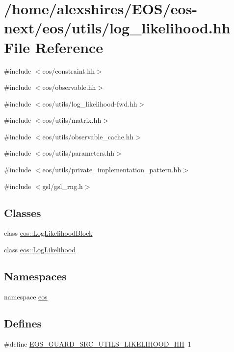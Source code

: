 \hypertarget{log__likelihood_8hh}{
\section{/home/alexshires/EOS/eos-\/next/eos/utils/log\_\-likelihood.hh File Reference}
\label{log__likelihood_8hh}
}
{\ttfamily \#include $<$eos/constraint.hh$>$}\par
{\ttfamily \#include $<$eos/observable.hh$>$}\par
{\ttfamily \#include $<$eos/utils/log\_\-likelihood-\/fwd.hh$>$}\par
{\ttfamily \#include $<$eos/utils/matrix.hh$>$}\par
{\ttfamily \#include $<$eos/utils/observable\_\-cache.hh$>$}\par
{\ttfamily \#include $<$eos/utils/parameters.hh$>$}\par
{\ttfamily \#include $<$eos/utils/private\_\-implementation\_\-pattern.hh$>$}\par
{\ttfamily \#include $<$gsl/gsl\_\-rng.h$>$}\par
\subsection*{Classes}
\begin{DoxyCompactItemize}
\item 
class \hyperlink{classeos_1_1LogLikelihoodBlock}{eos::LogLikelihoodBlock}
\item 
class \hyperlink{classeos_1_1LogLikelihood}{eos::LogLikelihood}
\end{DoxyCompactItemize}
\subsection*{Namespaces}
\begin{DoxyCompactItemize}
\item 
namespace \hyperlink{namespaceeos}{eos}
\end{DoxyCompactItemize}
\subsection*{Defines}
\begin{DoxyCompactItemize}
\item 
\#define \hyperlink{log__likelihood_8hh_a5a4c0a95f563cced9ee3e232e56ff9a7}{EOS\_\-GUARD\_\-SRC\_\-UTILS\_\-LIKELIHOOD\_\-HH}~1
\end{DoxyCompactItemize}


